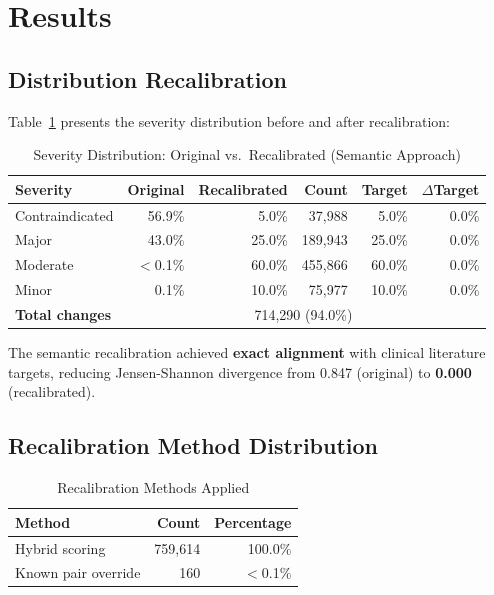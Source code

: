 \documentclass[11pt,a4paper]{article}
\begin{document}
\section{Results}

\subsection{Distribution Recalibration}

Table~\ref{tab:distribution_results} presents the severity distribution before and after recalibration:

\begin{table}[H]
\centering
\caption{Severity Distribution: Original vs.\ Recalibrated (Semantic Approach)}
\label{tab:distribution_results}
\begin{tabular}{@{}lrrrrr@{}}
\toprule
\textbf{Severity} & \textbf{Original} & \textbf{Recalibrated} & \textbf{Count} & \textbf{Target} & \textbf{$\Delta$Target} \\
\midrule
Contraindicated & 56.9\% & 5.0\% & 37,988 & 5.0\% & 0.0\% \\
Major & 43.0\% & 25.0\% & 189,943 & 25.0\% & 0.0\% \\
Moderate & $<$0.1\% & 60.0\% & 455,866 & 60.0\% & 0.0\% \\
Minor & 0.1\% & 10.0\% & 75,977 & 10.0\% & 0.0\% \\
\midrule
\textbf{Total changes} & \multicolumn{5}{c}{714,290 (94.0\%)} \\
\bottomrule
\end{tabular}
\end{table}

The semantic recalibration achieved \textbf{exact alignment} with clinical literature targets, reducing Jensen-Shannon divergence from 0.847 (original) to \textbf{0.000} (recalibrated).

\subsection{Recalibration Method Distribution}

\begin{table}[H]
\centering
\caption{Recalibration Methods Applied}
\label{tab:methods_applied}
\begin{tabular}{@{}lrr@{}}
\toprule
\textbf{Method} & \textbf{Count} & \textbf{Percentage} \\
\midrule
Hybrid scoring & 759,614 & 100.0\% \\
Known pair override & 160 & $<$0.1\% \\
\bottomrule
\end{tabular}
\end{table}
\end{document}
